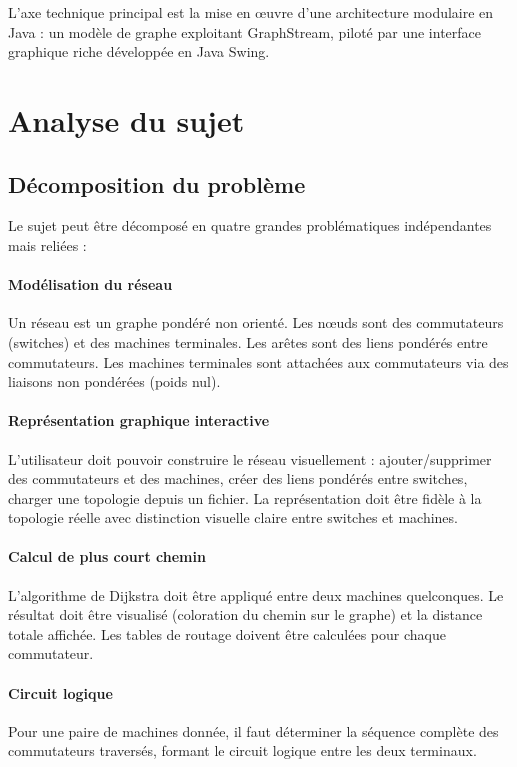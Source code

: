 \documentclass[12pt, a4paper]{article}
\begin{document}
L'axe technique principal est la mise en œuvre d'une architecture modulaire en Java : un modèle de graphe exploitant GraphStream, piloté par une interface graphique riche développée en Java Swing.

\section{Analyse du sujet}

\subsection{Décomposition du problème}

Le sujet peut être décomposé en quatre grandes problématiques indépendantes mais reliées :

\paragraph{Modélisation du réseau}
Un réseau est un graphe pondéré non orienté. Les nœuds sont des commutateurs (switches) et des machines terminales. Les arêtes sont des liens pondérés entre commutateurs. Les machines terminales sont attachées aux commutateurs via des liaisons non pondérées (poids nul).

\paragraph{Représentation graphique interactive}
L'utilisateur doit pouvoir construire le réseau visuellement : ajouter/supprimer des commutateurs et des machines, créer des liens pondérés entre switches, charger une topologie depuis un fichier. La représentation doit être fidèle à la topologie réelle avec distinction visuelle claire entre switches et machines.

\paragraph{Calcul de plus court chemin}
L'algorithme de Dijkstra doit être appliqué entre deux machines quelconques. Le résultat doit être visualisé (coloration du chemin sur le graphe) et la distance totale affichée. Les tables de routage doivent être calculées pour chaque commutateur.

\paragraph{Circuit logique}
Pour une paire de machines donnée, il faut déterminer la séquence complète des commutateurs traversés, formant le circuit logique entre les deux terminaux.
\end{document}
